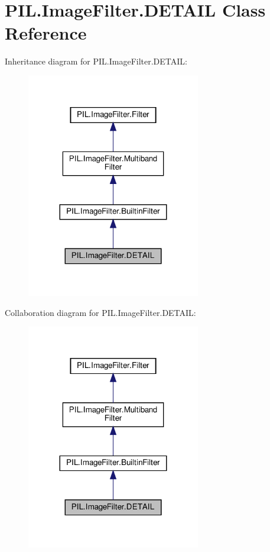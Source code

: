 \hypertarget{classPIL_1_1ImageFilter_1_1DETAIL}{}\section{P\+I\+L.\+Image\+Filter.\+D\+E\+T\+A\+IL Class Reference}
\label{classPIL_1_1ImageFilter_1_1DETAIL}


Inheritance diagram for P\+I\+L.\+Image\+Filter.\+D\+E\+T\+A\+IL\+:
\nopagebreak
\begin{figure}[H]
\begin{center}
\leavevmode
\includegraphics[width=215pt]{classPIL_1_1ImageFilter_1_1DETAIL__inherit__graph}
\end{center}
\end{figure}


Collaboration diagram for P\+I\+L.\+Image\+Filter.\+D\+E\+T\+A\+IL\+:
\nopagebreak
\begin{figure}[H]
\begin{center}
\leavevmode
\includegraphics[width=215pt]{classPIL_1_1ImageFilter_1_1DETAIL__coll__graph}
\end{center}
\end{figure}

